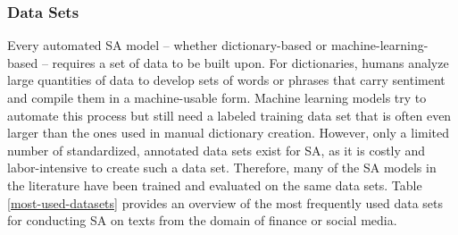\subsubsection{Data Sets}
\label{section-datasets}
Every automated SA model -- whether dictionary-based or machine-learning-based -- requires a set of data to be built upon. For dictionaries, humans analyze large quantities of data to develop sets of words or phrases that carry sentiment and compile them in a machine-usable form. Machine learning models try to automate this process but still need a labeled training data set that is often even larger than the ones used in manual dictionary creation. However, only a limited number of standardized, annotated data sets exist for SA, as it is costly and labor-intensive to create such a data set. Therefore, many of the SA models in the literature have been trained and evaluated on the same data sets. Table \ref{most-used-datasets} provides an overview of the most frequently used data sets for conducting SA on texts from the domain of finance or social media.



